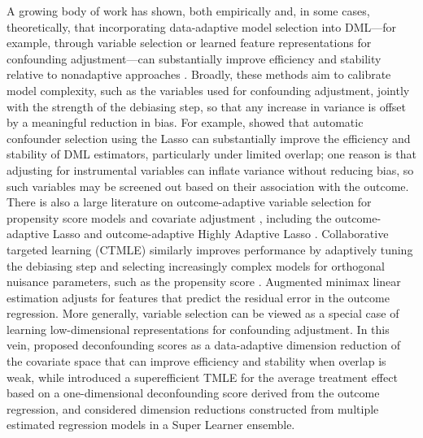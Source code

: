 \documentclass[11pt]{article}
\theoremstyle{definition}
\begin{document}
 


 
 

A growing body of work has shown, both empirically and, in some cases, theoretically, that incorporating data-adaptive model selection into DML---for example, through variable selection or learned feature representations for confounding adjustment---can substantially improve efficiency and stability relative to nonadaptive approaches \citep{brookhart2006variable, CTMLE, outcomeadaptivelasso, cui2019selective, ATEsupereff, d2021deconfounding,clivio2026deconfounding, assaad2021counterfactual, moosavi2023costs}. Broadly, these methods aim to calibrate model complexity, such as the variables used for confounding adjustment, jointly with the strength of the debiasing step, so that any increase in variance is offset by a meaningful reduction in bias. For example, \citet{moosavi2023costs} showed that automatic confounder selection using the Lasso can substantially improve the efficiency and stability of DML estimators, particularly under limited overlap; one reason is that adjusting for instrumental variables can inflate variance without reducing bias, so such variables may be screened out based on their association with the outcome. There is also a large literature on outcome-adaptive variable selection for propensity score models and covariate adjustment \citep{brookhart2006variable, westreich2011role, wyss2013variable, zhu2015variable, dukes2020obtain, outcomeadaptivelasso, CTMLE, CTMLELasso, HALoutcomeAdapt}, including the outcome-adaptive Lasso \citep{outcomeadaptivelasso} and outcome-adaptive Highly Adaptive Lasso \citep{HALoutcomeAdapt}. Collaborative targeted learning (CTMLE) \citep{CTMLE} similarly improves performance by adaptively tuning the debiasing step and selecting increasingly complex models for orthogonal nuisance parameters, such as the propensity score \citep{gruber2010application, pirracchio2018collaborative, schnitzer2018collaborative, CTMLELasso, ju2018collaborative, ju2019scalable, adaptiveTruncationCTMLE, ATEsupereff}. Augmented minimax linear estimation \citep{augmentedMinimax} adjusts for features that predict the residual error in the outcome regression. More generally, variable selection can be viewed as a special case of learning low-dimensional representations for confounding adjustment. In this vein, \citet{d2021deconfounding,clivio2026deconfounding} proposed deconfounding scores as a data-adaptive dimension reduction of the covariate space that can improve efficiency and stability when overlap is weak, while \citet{ATEsupereff} introduced a superefficient TMLE for the average treatment effect based on a one-dimensional deconfounding score derived from the outcome regression, and \citet{wang2023super} considered dimension reductions constructed from multiple estimated regression models in a Super Learner ensemble.
\end{document}
